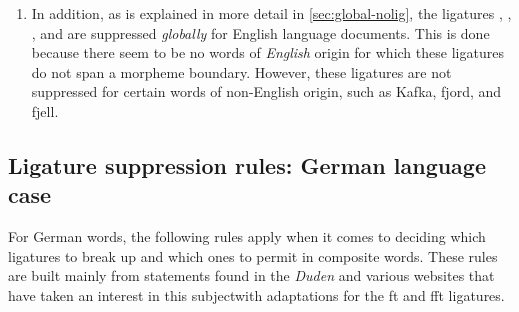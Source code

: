 \documentclass[11pt]{article}
\begin{document}
\begin{enumerate}
\item
In addition, as is explained in more detail in \cref{sec:global-nolig}, the ligatures {\ebg {}, , }, and {\ebg {}} are suppressed \emph{globally} for English language documents. This is done because there seem to be no words of \emph{English} origin for which these ligatures do not span a morpheme boundary. However, these ligatures are not suppressed for certain words of non-English origin, such as {\ebg Kafka, fjord, and fjell}. 

\end{enumerate}


\subsection[selnolig's ligature suppression rules: German language case]{Ligature suppression rules: German language case} \label{sec:german-rules}

For German words, the following rules apply when it comes to deciding which ligatures to break up and which ones to permit in composite words. These rules are built mainly from statements found in the \emph{Duden} and various websites that have taken an interest in this subject\textemdash with adaptations for the ft and fft ligatures.
\end{document}
